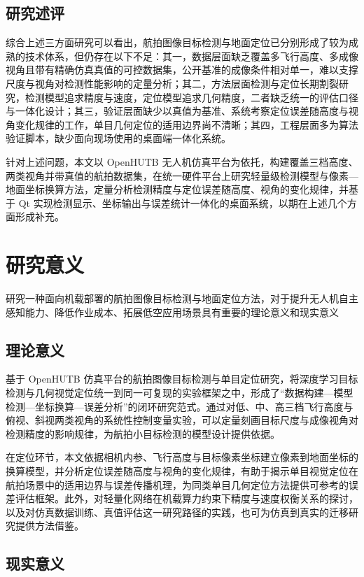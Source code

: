 \subsection{研究述评}
综合上述三方面研究可以看出，航拍图像目标检测与地面定位已分别形成了较为成熟的技术体系，但仍存在以下不足：其一，数据层面缺乏覆盖多飞行高度、多成像视角且带有精确仿真真值的可控数据集，公开基准的成像条件相对单一，难以支撑尺度与视角对检测性能影响的定量分析；其二，方法层面检测与定位长期割裂研究，检测模型追求精度与速度，定位模型追求几何精度，二者缺乏统一的评估口径与一体化设计；其三，验证层面缺少以真值为基准、系统考察定位误差随高度与视角变化规律的工作，单目几何定位的适用边界尚不清晰；其四，工程层面多为算法验证脚本，缺少面向现场使用的桌面端一体化系统。

针对上述问题，本文以 OpenHUTB 无人机仿真平台为依托，构建覆盖三档高度、两类视角并带真值的航拍数据集，在统一硬件平台上研究轻量级检测模型与像素—地面坐标换算方法，定量分析检测精度与定位误差随高度、视角的变化规律，并基于 Qt 实现检测显示、坐标输出与误差统计一体化的桌面系统，以期在上述几个方面形成补充。

\section{研究意义}

研究一种面向机载部署的航拍图像目标检测与地面定位方法，对于提升无人机自主感知能力、降低作业成本、拓展低空应用场景具有重要的理论意义和现实意义

\subsection{理论意义}

基于 OpenHUTB 仿真平台的航拍图像目标检测与单目定位研究，将深度学习目标检测与几何视觉定位统一到同一可复现的实验框架之中，形成了“数据构建—模型检测—坐标换算—误差分析”的闭环研究范式。通过对低、中、高三档飞行高度与俯视、斜视两类视角的系统性控制变量实验，可以定量刻画目标尺度与成像视角对检测精度的影响规律，为航拍小目标检测的模型设计提供依据。

在定位环节，本文依据相机内参、飞行高度与目标像素坐标建立像素到地面坐标的换算模型，并分析定位误差随高度与视角的变化规律，有助于揭示单目视觉定位在航拍场景中的适用边界与误差传播机理，为同类单目几何定位方法提供可参考的误差评估框架。此外，对轻量化网络在机载算力约束下精度与速度权衡关系的探讨，以及对仿真数据训练、真值评估这一研究路径的实践，也可为仿真到真实的迁移研究提供方法借鉴。

\subsection{现实意义}

